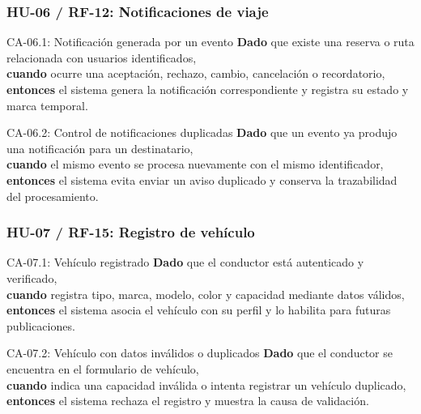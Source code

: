 \documentclass[12pt,a4paper]{article}
\begin{document}
\subsubsection{HU-06 / RF-12: Notificaciones de viaje}

\begin{GherkinBox}{CA-06.1: Notificación generada por un evento}
\textbf{Dado} que existe una reserva o ruta relacionada con usuarios identificados,\\
\textbf{cuando} ocurre una aceptación, rechazo, cambio, cancelación o recordatorio,\\
\textbf{entonces} el sistema genera la notificación correspondiente y registra su estado y marca temporal.
\end{GherkinBox}

\begin{GherkinBox}{CA-06.2: Control de notificaciones duplicadas}
\textbf{Dado} que un evento ya produjo una notificación para un destinatario,\\
\textbf{cuando} el mismo evento se procesa nuevamente con el mismo identificador,\\
\textbf{entonces} el sistema evita enviar un aviso duplicado y conserva la trazabilidad del procesamiento.
\end{GherkinBox}

\subsubsection{HU-07 / RF-15: Registro de vehículo}

\begin{GherkinBox}{CA-07.1: Vehículo registrado}
\textbf{Dado} que el conductor está autenticado y verificado,\\
\textbf{cuando} registra tipo, marca, modelo, color y capacidad mediante datos válidos,\\
\textbf{entonces} el sistema asocia el vehículo con su perfil y lo habilita para futuras publicaciones.
\end{GherkinBox}

\begin{GherkinBox}{CA-07.2: Vehículo con datos inválidos o duplicados}
\textbf{Dado} que el conductor se encuentra en el formulario de vehículo,\\
\textbf{cuando} indica una capacidad inválida o intenta registrar un vehículo duplicado,\\
\textbf{entonces} el sistema rechaza el registro y muestra la causa de validación.
\end{GherkinBox}
\end{document}
